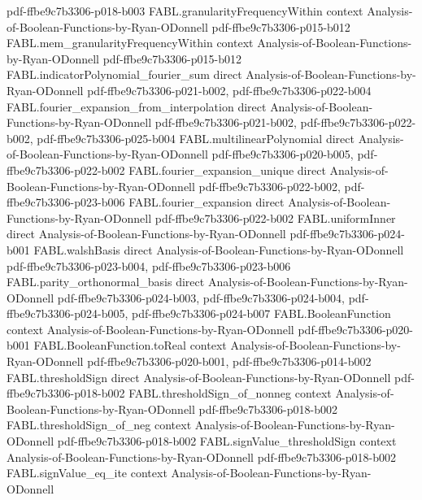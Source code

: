 \begin{theorem}
  {pdf-ffbe9c7b3306-p018-b003}
\proofstep
  {FABL.granularityFrequencyWithin}
  {context}
  {Analysis-of-Boolean-Functions-by-Ryan-ODonnell}
  {pdf-ffbe9c7b3306-p015-b012}
\proofstep
  {FABL.mem_granularityFrequencyWithin}
  {context}
  {Analysis-of-Boolean-Functions-by-Ryan-ODonnell}
  {pdf-ffbe9c7b3306-p015-b012}
\proofstep
  {FABL.indicatorPolynomial_fourier_sum}
  {direct}
  {Analysis-of-Boolean-Functions-by-Ryan-ODonnell}
  {pdf-ffbe9c7b3306-p021-b002,
    pdf-ffbe9c7b3306-p022-b004}
\proofstep
  {FABL.fourier_expansion_from_interpolation}
  {direct}
  {Analysis-of-Boolean-Functions-by-Ryan-ODonnell}
  {pdf-ffbe9c7b3306-p021-b002,
    pdf-ffbe9c7b3306-p022-b002,
    pdf-ffbe9c7b3306-p025-b004}
\proofstep
  {FABL.multilinearPolynomial}
  {direct}
  {Analysis-of-Boolean-Functions-by-Ryan-ODonnell}
  {pdf-ffbe9c7b3306-p020-b005,
    pdf-ffbe9c7b3306-p022-b002}
\proofstep
  {FABL.fourier_expansion_unique}
  {direct}
  {Analysis-of-Boolean-Functions-by-Ryan-ODonnell}
  {pdf-ffbe9c7b3306-p022-b002,
    pdf-ffbe9c7b3306-p023-b006}
\proofstep
  {FABL.fourier_expansion}
  {direct}
  {Analysis-of-Boolean-Functions-by-Ryan-ODonnell}
  {pdf-ffbe9c7b3306-p022-b002}
\proofstep
  {FABL.uniformInner}
  {direct}
  {Analysis-of-Boolean-Functions-by-Ryan-ODonnell}
  {pdf-ffbe9c7b3306-p024-b001}
\proofstep
  {FABL.walshBasis}
  {direct}
  {Analysis-of-Boolean-Functions-by-Ryan-ODonnell}
  {pdf-ffbe9c7b3306-p023-b004,
    pdf-ffbe9c7b3306-p023-b006}
\proofstep
  {FABL.parity_orthonormal_basis}
  {direct}
  {Analysis-of-Boolean-Functions-by-Ryan-ODonnell}
  {pdf-ffbe9c7b3306-p024-b003,
    pdf-ffbe9c7b3306-p024-b004,
    pdf-ffbe9c7b3306-p024-b005,
    pdf-ffbe9c7b3306-p024-b007}
\proofstep
  {FABL.BooleanFunction}
  {context}
  {Analysis-of-Boolean-Functions-by-Ryan-ODonnell}
  {pdf-ffbe9c7b3306-p020-b001}
\proofstep
  {FABL.BooleanFunction.toReal}
  {context}
  {Analysis-of-Boolean-Functions-by-Ryan-ODonnell}
  {pdf-ffbe9c7b3306-p020-b001,
    pdf-ffbe9c7b3306-p014-b002}
\proofstep
  {FABL.thresholdSign}
  {direct}
  {Analysis-of-Boolean-Functions-by-Ryan-ODonnell}
  {pdf-ffbe9c7b3306-p018-b002}
\proofstep
  {FABL.thresholdSign_of_nonneg}
  {context}
  {Analysis-of-Boolean-Functions-by-Ryan-ODonnell}
  {pdf-ffbe9c7b3306-p018-b002}
\proofstep
  {FABL.thresholdSign_of_neg}
  {context}
  {Analysis-of-Boolean-Functions-by-Ryan-ODonnell}
  {pdf-ffbe9c7b3306-p018-b002}
\proofstep
  {FABL.signValue_thresholdSign}
  {context}
  {Analysis-of-Boolean-Functions-by-Ryan-ODonnell}
  {pdf-ffbe9c7b3306-p018-b002}
\proofstep
  {FABL.signValue_eq_ite}
  {context}
  {Analysis-of-Boolean-Functions-by-Ryan-ODonnell}

\end{theorem}
